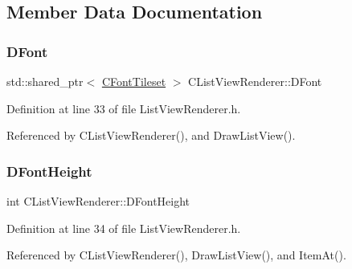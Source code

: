 \subsection{Member Data Documentation}
\hypertarget{classCListViewRenderer_a1fc512e6dd37dba02b6e6fa5800ef222}{}\label{classCListViewRenderer_a1fc512e6dd37dba02b6e6fa5800ef222} 
\subsubsection{\texorpdfstring{D\+Font}{DFont}}
{\footnotesize\ttfamily std\+::shared\+\_\+ptr$<$ \hyperlink{classCFontTileset}{C\+Font\+Tileset} $>$ C\+List\+View\+Renderer\+::\+D\+Font\hspace{0.3cm}{\ttfamily [protected]}}



Definition at line 33 of file List\+View\+Renderer.\+h.



Referenced by C\+List\+View\+Renderer(), and Draw\+List\+View().

\hypertarget{classCListViewRenderer_a4d5e792e525ca2df01f0300bfe1248af}{}\label{classCListViewRenderer_a4d5e792e525ca2df01f0300bfe1248af} 
\subsubsection{\texorpdfstring{D\+Font\+Height}{DFontHeight}}
{\footnotesize\ttfamily int C\+List\+View\+Renderer\+::\+D\+Font\+Height\hspace{0.3cm}{\ttfamily [protected]}}



Definition at line 34 of file List\+View\+Renderer.\+h.



Referenced by C\+List\+View\+Renderer(), Draw\+List\+View(), and Item\+At().

\hypertarget{classCListViewRenderer_af6e36f127e551dd54c01f8df0fadeb9c}{}\label{classCListViewRenderer_af6e36f127e551dd54c01f8df0fadeb9c} 
